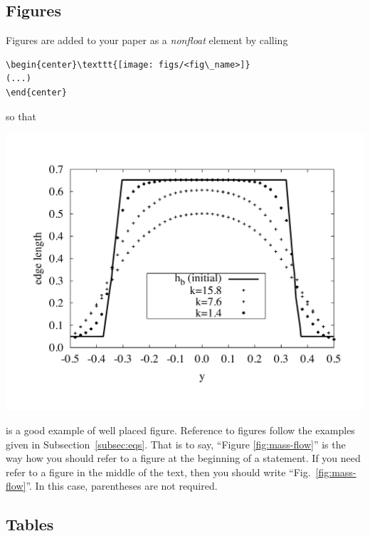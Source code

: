 \documentclass[date]{ppgem}
\begin{document}
\begin{multicols}{2}
\subsection{Figures}

Figures are added to your paper as a \emph{nonfloat} element by calling

\begin{verbatim}
\begin{center}\texttt{[image: figs/<fig\_name>]} 
(...)
\end{center}
\end{verbatim}

so that

\begin{center}
\includegraphics[scale=0.33]{figs/example}
\label{fig:mass-flow}
\end{center}
is a good example of well placed figure. Reference to figures follow the
examples given in Subsection~\ref{subsec:eqs}. That is to say, ``Figure
\eqref{fig:mass-flow}'' is the way how you should refer to a figure at
the beginning of a statement. If you need refer to a figure in the
middle of the text, then you should write ``Fig.~\ref{fig:mass-flow}''.
In this case, parentheses are not required.

\subsection{Tables}


\end{multicols}
\end{document}

